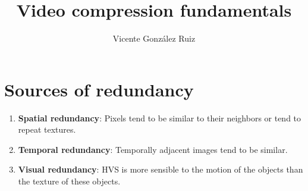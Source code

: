 \title{Video compression fundamentals}
\author{Vicente González Ruiz}
\maketitle

\section{Sources of redundancy}
\begin{enumerate}
\item
  \textbf{Spatial redundancy}: Pixels tend to be similar to their
  neighbors or tend to repeat textures.
\item
  \textbf{Temporal redundancy}: Temporally adjacent images tend to be
  similar.
\item
  \textbf{Visual redundancy}: HVS is more sensible to the motion of
  the objects than the texture of these objects.
\end{enumerate}

